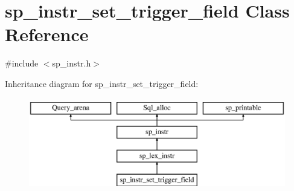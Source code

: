 \hypertarget{classsp__instr__set__trigger__field}{}\section{sp\+\_\+instr\+\_\+set\+\_\+trigger\+\_\+field Class Reference}
\label{classsp__instr__set__trigger__field}


{\ttfamily \#include $<$sp\+\_\+instr.\+h$>$}

Inheritance diagram for sp\+\_\+instr\+\_\+set\+\_\+trigger\+\_\+field\+:\begin{figure}[H]
\begin{center}
\leavevmode
\includegraphics[height=4.000000cm]{classsp__instr__set__trigger__field}
\end{center}
\end{figure}

